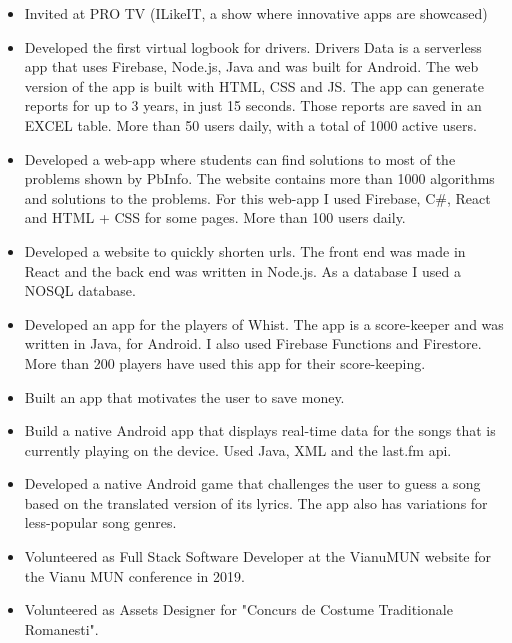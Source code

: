 \begin{itemize}
    \item Invited at PRO TV (ILikeIT, a show where innovative apps are showcased)
\end{itemize}

\begin{itemize}
    \item Developed the first virtual logbook for drivers. Drivers Data is a serverless app that uses Firebase, Node.js, Java and was built for Android. The web version of the app is built with HTML, CSS and JS. The app can generate reports for up to 3 years, in just 15 seconds. Those reports are saved in an EXCEL table. More than 50 users daily, with a total of 1000 active users.
\end{itemize}
\begin{itemize}
    \item Developed a web-app where students can find solutions to most of the problems shown by PbInfo. The website contains more than 1000 algorithms and solutions to the problems. For this web-app I used Firebase, C\#, React and HTML + CSS for some pages. More than 100 users daily.
\end{itemize}
\begin{itemize}
    \item Developed a website to quickly shorten urls. The front end was made in React and the back end was written in Node.js. As a database I used a NOSQL database.
\end{itemize}
\begin{itemize}
    \item Developed an app for the players of Whist. The app is a score-keeper and was written in Java, for Android. I also used Firebase Functions and Firestore. More than 200 players have used this app for their score-keeping.
\end{itemize}
\begin{itemize}
    \item Built an app that motivates the user to save money.
\end{itemize}
\begin{itemize}
    \item Build a native Android app that displays real-time data for the songs that is currently playing on the device. Used Java, XML and the last.fm api.
\end{itemize}
\begin{itemize}
    \item Developed a native Android game that challenges the user to guess a song based on the translated version of its lyrics. The app also has variations for less-popular song genres.
\end{itemize}
\cvproject{}

\begin{itemize}
    \item Volunteered as Full Stack Software Developer at the VianuMUN website for the Vianu MUN conference in 2019.
    \item Volunteered as Assets Designer for "Concurs de Costume Traditionale Romanesti".
\end{itemize}